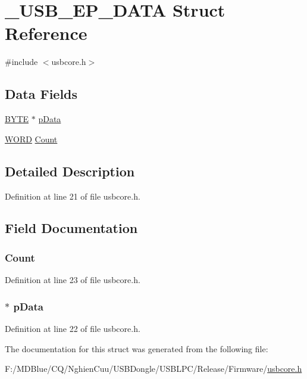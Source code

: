 \hypertarget{struct___u_s_b___e_p___d_a_t_a}{
\section{\_\-USB\_\-EP\_\-DATA Struct Reference}
\label{struct___u_s_b___e_p___d_a_t_a}
}


{\ttfamily \#include $<$usbcore.h$>$}

\subsection*{Data Fields}
\begin{DoxyCompactItemize}
\item 
\hyperlink{type_8h_a4ae1dab0fb4b072a66584546209e7d58}{BYTE} $\ast$ \hyperlink{struct___u_s_b___e_p___d_a_t_a_a118c6325e791463d77b2058f12173633}{pData}
\item 
\hyperlink{type_8h_a197942eefa7db30960ae396d68339b97}{WORD} \hyperlink{struct___u_s_b___e_p___d_a_t_a_a9dee27dcb07b57baae1d24c47eebbe86}{Count}
\end{DoxyCompactItemize}


\subsection{Detailed Description}


Definition at line 21 of file usbcore.h.



\subsection{Field Documentation}
\hypertarget{struct___u_s_b___e_p___d_a_t_a_a9dee27dcb07b57baae1d24c47eebbe86}{
\subsubsection[{Count}]{ {\bf Count}}}
\label{struct___u_s_b___e_p___d_a_t_a_a9dee27dcb07b57baae1d24c47eebbe86}


Definition at line 23 of file usbcore.h.

\hypertarget{struct___u_s_b___e_p___d_a_t_a_a118c6325e791463d77b2058f12173633}{
\subsubsection[{pData}]{$\ast$ {\bf pData}}}
\label{struct___u_s_b___e_p___d_a_t_a_a118c6325e791463d77b2058f12173633}


Definition at line 22 of file usbcore.h.



The documentation for this struct was generated from the following file:\begin{DoxyCompactItemize}
\item 
F:/MDBlue/CQ/NghienCuu/USBDongle/USBLPC/Release/Firmware/\hyperlink{usbcore_8h}{usbcore.h}\end{DoxyCompactItemize}
